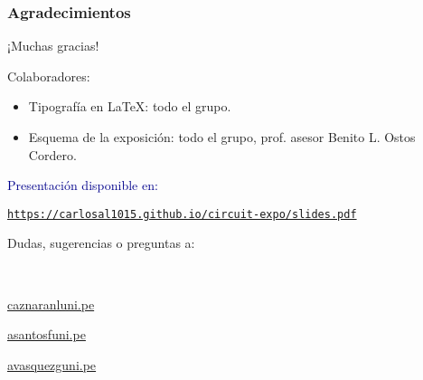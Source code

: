 \begin{frame}
	\frametitle{Agradecimientos}
	\begin{center}\Large
		¡Muchas gracias!
	\end{center}

	Colaboradores:

	\begin{itemize}
		\item Tipografía en \LaTeX{}: todo el grupo.
		\item Esquema de la exposición: todo el grupo, prof. asesor Benito L. Ostos Cordero.
	\end{itemize}
	\vfill
	\begin{minipage}{0.45\paperwidth}
		\textcolor{DarkBlue}{Presentación disponible en:}
		\begin{center}
			\href{https://carlosal1015.github.io/circuit-expo/slides.pdf}{\texttt{https://carlosal1015.github.io/circuit-expo/slides.pdf}}
		\end{center}
	\end{minipage}
	\hfill
	\begin{minipage}{0.45\paperwidth}
		\begin{flushright}
			Dudas, sugerencias o preguntas a:

			\

			\href{mailto:caznaranl@uni.pe}{caznaranl\MVAt uni.pe}

			\href{mailto:asantosf@uni.pe}{asantosf\MVAt uni.pe}

			\href{mailto:avasquezg@uni.pe}{avasquezg\MVAt uni.pe}
		\end{flushright}
	\end{minipage}

\end{frame}

